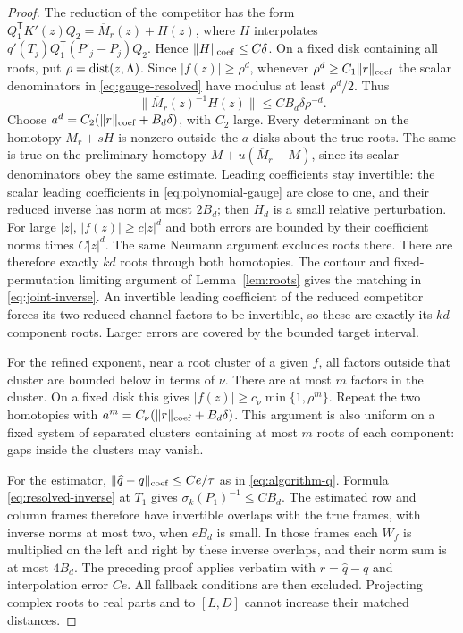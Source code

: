 \begin{proof}
The reduction of the competitor has the form
$Q_1^{\mathsf T}K'(z)Q_2=\overline M_r(z)+H(z)$, where $H$ interpolates
$q'(T_j)Q_1^{\mathsf T}(P'_j-P_j)Q_2$. Hence
$\|H\|_{\rm coef}\le C\delta$. On a fixed disk containing all roots,
put $\rho=\operatorname{dist}(z,\Lambda)$. Since $|f(z)|\ge\rho^d$, whenever
$\rho^d\ge C_1\|r\|_{\rm coef}$ the scalar denominators in
\eqref{eq:gauge-resolved} have modulus at least $\rho^d/2$. Thus
\[
 \|\overline M_r(z)^{-1}H(z)\|
 \le C B_d\delta\rho^{-d}.
\]
Choose $a^d=C_2(\|r\|_{\rm coef}+B_d\delta)$, with $C_2$ large.
Every determinant on the homotopy $\overline M_r+sH$ is nonzero outside
the $a$-disks about the true roots. The same is true on the preliminary
homotopy $M+u(\overline M_r-M)$, since its scalar denominators obey the
same estimate. Leading coefficients stay invertible: the scalar leading
coefficients in \eqref{eq:polynomial-gauge} are close to one, and their
reduced inverse has norm at most $2B_d$; then $H_d$ is a small relative
perturbation. For large $|z|$, $|f(z)|\ge c|z|^d$ and both errors are
bounded by their coefficient norms times $C|z|^d$. The same Neumann
argument excludes roots there. There are therefore exactly $kd$ roots
through both homotopies. The contour and fixed-permutation limiting
argument of Lemma~\ref{lem:roots} gives the matching in
\eqref{eq:joint-inverse}. An invertible leading coefficient of the
reduced competitor forces its two reduced channel factors to be
invertible, so these are exactly its $kd$ component roots. Larger
errors are covered by the bounded target interval.

For the refined exponent, near a root cluster of a given $f$, all
factors outside that cluster are bounded below in terms of $\nu$.
There are at most $m$ factors in the cluster. On a fixed disk this gives
$|f(z)|\ge c_\nu\min\{1,\rho^m\}$. Repeat the two homotopies with
$a^m=C_\nu(\|r\|_{\rm coef}+B_d\delta)$. This argument is also
uniform on a fixed system of separated clusters containing at most
$m$ roots of each component: gaps inside the clusters may vanish.

For the estimator, $\|\widehat q-q\|_{\rm coef}\le Ce/\tau$ as in
\eqref{eq:algorithm-q}. Formula \eqref{eq:resolved-inverse} at $T_1$
gives $\sigma_k(P_1)^{-1}\le CB_d$. The estimated row and column
frames therefore have invertible overlaps with the true frames,
with inverse norms at most two, when $eB_d$ is small. In those frames
each $W_f$ is multiplied on the left and right by these inverse
overlaps, and their norm sum is at most $4B_d$. The preceding proof
applies verbatim with $r=\widehat q-q$ and interpolation error $Ce$.
All fallback conditions are then excluded. Projecting complex roots
to real parts and to $[L,D]$ cannot increase their matched distances.


\end{proof}
